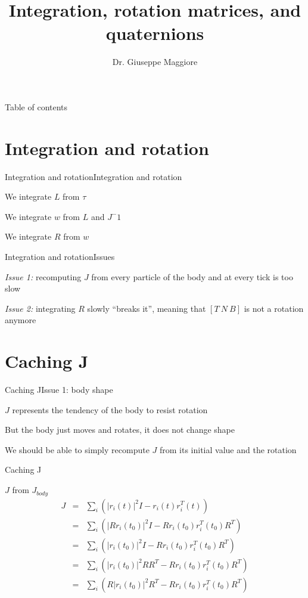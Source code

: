 \documentclass{beamer}
\title{Integration, rotation matrices, and quaternions}
\author{Dr. Giuseppe Maggiore}
\institute{NHTV University of Applied Sciences \\ 
Breda, Netherlands}
\date{}
\begin{document}
\maketitle

\begin{frame}{Table of contents}
\tableofcontents
\end{frame}

\section{Integration and rotation}
\begin{slide}{Integration and rotation}{Integration and rotation}{
\item We integrate $L$ from $\tau$
\item We integrate $w$ from $L$ and $J^-1$
\item We integrate $R$ from $w$
}\end{slide}

\begin{slide}{Integration and rotation}{Issues}{
\item \textit{Issue 1:} recomputing $J$ from every particle of the body and at every tick is too slow
\item \textit{Issue 2:} integrating $R$ slowly ``breaks it'', meaning that $[T\ N\ B]$ is not a rotation anymore
}\end{slide}

\section{Caching J}
\begin{slide}{Caching J}{Issue 1: body shape}{
\item $J$ represents the tendency of the body to resist rotation
\item But the body just moves and rotates, it does not change shape
\item We should be able to simply recompute $J$ from its initial value and the rotation
}\end{slide}

\begin{frame}{Caching J}
\begin{block}{$J$ from $J_{body}$}
\begin{eqnarray}
J &=& \sum_i(|r_i(t)|^2I - r_i(t) r_i^T(t)) \\
&=& \sum_i(|R r_i(t_0)|^2I - R r_i(t_0) r_i^T(t_0) R^T) \\
&=& \sum_i(|r_i(t_0)|^2I - R r_i(t_0) r_i^T(t_0) R^T) \\ %
&=& \sum_i(|r_i(t_0)|^2 R R^T - R r_i(t_0) r_i^T(t_0) R^T) \\ %
&=& \sum_i(R |r_i(t_0)|^2 R^T - R r_i(t_0) r_i^T(t_0) R^T) %
\end{eqnarray}
\end{block}
\end{frame}
\end{document}
